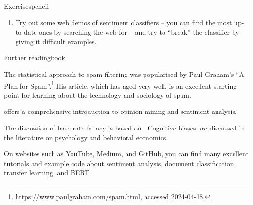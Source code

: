 \begin{tblsfilledsymbol}{Exercises}{pencil}
\begin{enumerate}
\item  Try out some web demos of sentiment classifiers -- you can find the most up-to-date ones by searching the web for  -- and try to ``break'' the classifier by giving it difficult examples.

\end{enumerate}
\end{tblsfilledsymbol}



\begin{tblsfilledsymbol}{Further reading}{book}
    
The statistical approach to spam filtering was popularised by Paul Graham's ``A Plan for Spam''.\footnote{\url{https://www.paulgraham.com/spam.html}, accessed 2024-04-18.} His article, which has aged very well, is an excellent starting point for learning about the technology and sociology of spam.  
  
  \citet{DBLP:journals/ftir/PangL07} offers a comprehensive introduction to opinion-mining and sentiment analysis. 
  
  The discussion of base rate fallacy is based on \citet{BarHillel:80}. Cognitive biases are discussed in the literature on psychology and behavioral economics.  
  
  On websites such as YouTube, Medium, and GitHub, you can find many excellent tutorials and example code about sentiment analysis, document classification,  transfer learning, and BERT.

\end{tblsfilledsymbol}
